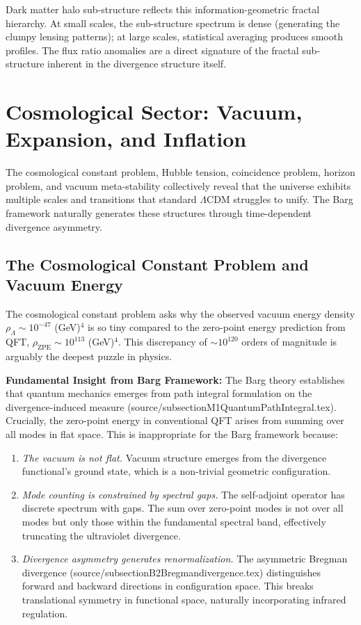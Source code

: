 \documentclass[12pt,a4paper]{article}
\begin{document}
Dark matter halo sub-structure reflects this information-geometric fractal hierarchy. At small scales, the sub-structure spectrum is dense (generating the clumpy lensing patterns); at large scales, statistical averaging produces smooth profiles. The flux ratio anomalies are a direct signature of the fractal sub-structure inherent in the divergence structure itself.

\section{Cosmological Sector: Vacuum, Expansion, and Inflation}

The cosmological constant problem, Hubble tension, coincidence problem, horizon problem, and vacuum meta-stability collectively reveal that the universe exhibits multiple scales and transitions that standard $\Lambda$CDM struggles to unify. The Barg framework naturally generates these structures through time-dependent divergence asymmetry.

\subsection{The Cosmological Constant Problem and Vacuum Energy}

The cosmological constant problem asks why the observed vacuum energy density $\rho_\Lambda \sim 10^{-47}$ (GeV)$^4$ is so tiny compared to the zero-point energy prediction from QFT, $\rho_{\text{ZPE}} \sim 10^{113}$ (GeV)$^4$. This discrepancy of $\sim 10^{120}$ orders of magnitude is arguably the deepest puzzle in physics.

\textbf{Fundamental Insight from Barg Framework:} The Barg theory establishes that quantum mechanics emerges from path integral formulation on the divergence-induced measure (source/subsectionM1QuantumPathIntegral.tex). Crucially, the zero-point energy in conventional QFT arises from summing over all modes in flat space. This is inappropriate for the Barg framework because:

\begin{enumerate}
\item \textit{The vacuum is not flat.} Vacuum structure emerges from the divergence functional's ground state, which is a non-trivial geometric configuration.

\item \textit{Mode counting is constrained by spectral gaps.} The self-adjoint operator has discrete spectrum with gaps. The sum over zero-point modes is not over all modes but only those within the fundamental spectral band, effectively truncating the ultraviolet divergence.

\item \textit{Divergence asymmetry generates renormalization.} The asymmetric Bregman divergence (source/subsectionB2Bregmandivergence.tex) distinguishes forward and backward directions in configuration space. This breaks translational symmetry in functional space, naturally incorporating infrared regulation.
\end{enumerate}
\end{document}
